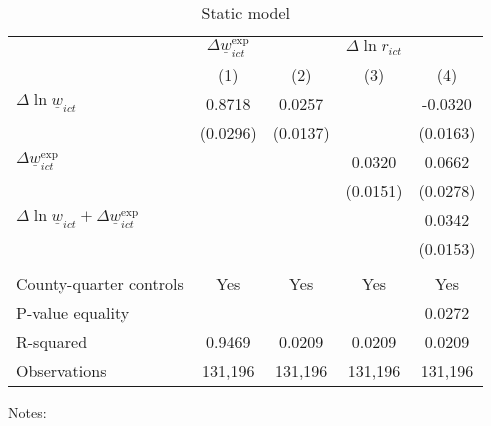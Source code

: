 \begin{table}
    \caption{Static model}
    \label{tab:static}

    \begin{tabular}{l*{4}{c}}
    \toprule
     & \multicolumn{1}{c}{$\Delta \underline{w}_{ict}^{\text{exp}}$}
     & \multicolumn{3}{c}{$\Delta \ln r_{ict}$}                                  \\ \cmidrule(lr){2-2}\cmidrule(lr){3-5}
     & \multicolumn{1}{c}{(1)} & \multicolumn{1}{c}{(2)} 
     & \multicolumn{1}{c}{(3)} & \multicolumn{1}{c}{(4)}                         \\ \midrule
    $\Delta \ln \underline{w}_{ict}$          &  0.8718  &  0.0257  &       &  -0.0320     \\
                                              & (0.0296) & (0.0137) &       & (0.0163)    \\
    $\Delta \underline{w}_{ict}^{\text{exp}}$ &       &       &  0.0320  & 0.0662      \\
                                              &       &       & (0.0151) & (0.0278)    \\ \midrule
    $\Delta \ln \underline{w}_{ict}+
      \Delta \underline{w}_{ict}^{\text{exp}}$&       &       &       &  0.0342     \\
                                              &       &       &       & (0.0153)    \\
                                              &       &       &       &          \\ \midrule
    County-quarter controls                   &  Yes  & Yes   & Yes   & Yes      \\
    P-value equality                          &       &       &       & 0.0272      \\
    R-squared                                 &  0.9469  &  0.0209  &  0.0209  & 0.0209      \\
    Observations                              & 131,196  & 131,196  & 131,196  & 131,196     \\\bottomrule
    \end{tabular}

    \begin{minipage}{.95\textwidth} \footnotesize
        \vspace{2mm}
        Notes: 
    \end{minipage}
\end{table}
